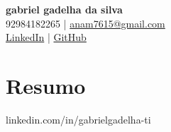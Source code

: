 \documentclass[letterpaper,10pt]{article}
\begin{document}
    \begin{center}
    \textbf{\Huge gabriel gadelha da silva} \\
    \small 92984182265 | \href{mailto:anam7615@gmail.com}{anam7615@gmail.com} \\
    \href{linkedin.com/in/gabrielgadelha-ti}{LinkedIn} | \href{linkedin.com/in/gabrielgadelha-ti}{GitHub}
    \end{center}
    
    \section*{Resumo}
    linkedin.com/in/gabrielgadelha-ti
    
    
\end{document}
